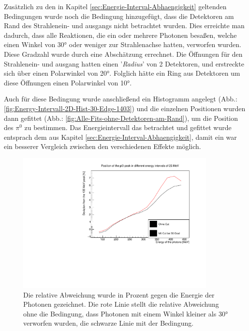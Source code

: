 \documentclass[a4paper,11pt,oneside,final,german,openbib,pdftex]{scrbook}
\begin{document}
{%

Zus\"atzlich zu den in Kapitel \ref{sec:Energie-Interval-Abhaengigkeit} geltenden Bedingungen wurde noch die Bedingung hinzugef\"ugt, dass die Detektoren am Rand des Strahlenein- und ausgangs nicht betrachtet wurden. Dies erreichte man dadurch, dass alle Reaktionen, die ein oder mehrere Photonen besa{\ss}en, welche einen Winkel von 30° oder weniger zur Strahlenachse hatten, verworfen wurden. Diese Gradzahl wurde durch eine Absch\"atzung errechnet. Die \"Offnungen f\"ur den Strahlenein- und ausgang hatten einen '\textit{Radius}' von 2 Detektoren, und erstreckte sich \"uber einen Polarwinkel von 20°. Folglich h\"atte ein Ring aus Detektoren um diese \"Offnungen einen Polarwinkel von 10°. 
 
Auch f\"ur diese Bedingung wurde anschlie{\ss}end ein Histogramm angelegt (Abb.: \ref{fig:Energy-Intervall-2D-Hist-30-Edge-1403}) und die einzelnen Positionen wurden dann gefittet (Abb.: \ref{fig:Alle-Fits-ohne-Detektoren-am-Rand}), um die Position des $\pi^0$ zu bestimmen. Das Energieintervall das betrachtet und gefittet wurde entsprach dem aus Kapitel \ref{sec:Energie-Interval-Abhaengigkeit}, damit ein war ein besserer Vergleich zwischen den verschiedenen Effekte m\"oglich.

\begin{figure}[h!]
	\begin{center}
		\includegraphics[width=100mm]{20172803SymmetricUnchargedDeviationCut}
		\caption{Die relative Abweichung wurde in Prozent gegen die Energie der Photonen gezeichnet. Die rote Linie stellt die relative Abweichung ohne die Bedingung, dass Photonen mit einem Winkel kleiner als 30° verworfen wurden, die schwarze Linie mit der Bedingung.}
	\end{center}
\end{figure}

}
\end{document}

